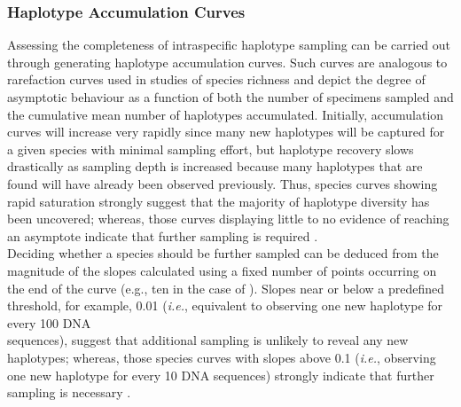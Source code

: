\vspace{5mm}

\subsubsection{Haplotype Accumulation Curves}

Assessing the completeness of intraspecific haplotype sampling can be carried out through generating haplotype accumulation curves. Such curves are analogous to \\ rarefaction curves used in studies of species richness \cite{gotelli2001quantifying} and depict the degree of \\ asymptotic behaviour as a function of both the number of specimens sampled and the cumulative mean number of haplotypes accumulated. Initially, accumulation curves will increase very rapidly since many new haplotypes will be captured for a given species with minimal sampling effort, but haplotype recovery slows drastically as sampling depth is increased because many haplotypes that are found will have already been observed previously. Thus, species curves showing rapid saturation strongly suggest that the majority of haplotype diversity has been uncovered; whereas, those curves displaying little to no evidence of reaching an asymptote indicate that further sampling is required \cite{zhang2010estimating}. \\ Deciding whether a species should be further sampled can be deduced from the magnitude of the slopes calculated using a fixed number of points occurring on the end of the curve (e.g., ten in the case of \cite{phillips2015exploration, young2012revealing}). Slopes near or below a predefined threshold, for example, 0.01 (\textit{i.e.}, equivalent to observing one new haplotype for every 100 DNA \\ sequences), suggest that additional sampling is unlikely to reveal any  new haplotypes; whereas, those species curves with slopes above 0.1 (\textit{i.e.}, observing one new haplotype for every 10 DNA sequences) strongly indicate that further sampling is necessary \cite{hortal2005ed}. 

\vspace{5mm}

